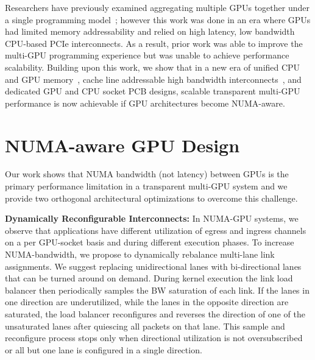 \documentclass{sig-alternate}
\begin{document}
Researchers have previously examined aggregating multiple GPUs together under a single 
programming model~\cite{lee2013transparent,Cabezas2015}; however this work was 
done in an era where GPUs had limited memory addressability and relied on high 
latency, low bandwidth CPU-based PCIe interconnects. As a result, prior work 
was able to improve the multi-GPU programming experience but was unable to achieve
performance scalability. Building upon this work, we show that in a new
era of unified CPU and GPU memory~\cite{UVM}, cache line addressable high 
bandwidth interconnects~\cite{NVLINK}, and dedicated GPU and CPU socket PCB 
designs, scalable transparent multi-GPU performance is now achievable if GPU
architectures become NUMA-aware.

\vspace{-.05in}
\section{NUMA-aware GPU Design}

Our work shows that NUMA bandwidth (not latency) between GPUs is the primary
performance limitation in a transparent multi-GPU system and we provide two orthogonal
architectural optimizations to overcome this challenge.

\textbf{Dynamically Reconfigurable Interconnects:} In NUMA-GPU systems, we 
observe that applications have different utilization of egress and ingress 
channels on a per GPU-socket basis and during different execution phases. 
To increase NUMA-bandwidth, we propose to dynamically rebalance multi-lane link assignments. 
We suggest replacing unidirectional lanes with bi-directional 
lanes that can be turned around on demand. During kernel 
execution the link load balancer then periodically samples the BW saturation of each 
link. If the lanes in one direction are underutilized, while the lanes in the 
opposite direction are saturated, the load balancer reconfigures and 
reverses the direction of one of the unsaturated lanes after quiescing all 
packets on that lane. This sample and reconfigure process stops only when 
directional utilization is not oversubscribed or all but one lane is configured 
in a single direction.
\end{document}
